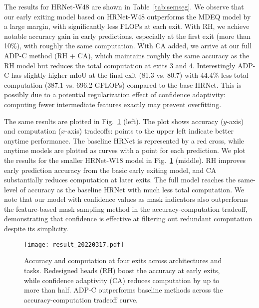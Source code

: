 The results for HRNet-W48 are shown in Table~\ref{tab:semseg}.
We observe that our early exiting model based on HRNet-W48 outperforms the MDEQ model by a large margin, with significantly less FLOPs at each exit.
With RH, we achieve notable accuracy gain in early predictions, especially at the first exit (more than 10\%), with roughly the same computation.
With CA added, we arrive at our full ADP-C method (RH + CA), which maintains roughly the same accuracy as the RH model but reduces the total computation at exits 3 and 4.
Interestingly ADP-C has slightly higher mIoU at the final exit (81.3 vs. 80.7) with 44.4\% less total computation (387.1 vs. 696.2 GFLOPs) compared to the base HRNet.
This is possibly due to a potential regularization effect of confidence adaptivity: computing fewer intermediate features exactly may prevent overfitting.



The same results are plotted in Fig.~\ref{fig:result} (left).
The plot shows accuracy ($y$-axis) and computation ($x$-axis) tradeoffs: points to the upper left indicate better anytime performance.
The baseline HRNet is represented by a red cross, while anytime models are plotted as curves with a point for each prediction.
We plot the results for the smaller HRNet-W18 model in Fig.~\ref{fig:result} (middle).
RH improves early prediction accuracy from the basic early exiting model, and CA substantially reduces computation at later exits.
The full model reaches the same-level of accuracy as the baseline HRNet with much less total computation. We note that our model with confidence values as mask indicators also outperforms the feature-based mask sampling method in the accuracy-computation tradeoff, demonstrating that confidence is effective at filtering out redundant computation despite its simplicity.

\begin{figure}[htbp]
\texttt{[image: result\_20220317.pdf]}
\caption{%
Accuracy and computation at four exits across architectures and tasks.
Redesigned heads (RH) boost the accuracy at early exits, while confidence adaptivity (CA) reduces computation by up to more than half.
ADP-C outperforms baseline methods across the accuracy-computation tradeoff curve.
}
\label{fig:result}
\end{figure}


